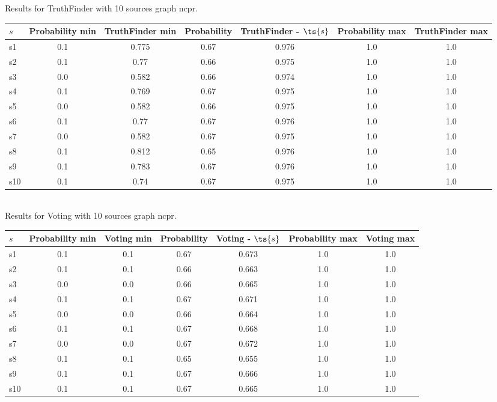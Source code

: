 \documentclass{article}
\begin{document}
\noindent Results for TruthFinder with 10 sources graph ncpr.

\noindent\begin{tabular}{|l|c|c|c|c|c|c|}
\hline
$s$& Probability min & TruthFinder min & Probability & TruthFinder - $\ts{s}$ & Probability max & TruthFinder max\\
\hline
s1 &0.1 & 0.775 & 0.67 & 0.976 & 1.0 & 1.0\\
\hline
s2 &0.1 & 0.77 & 0.66 & 0.975 & 1.0 & 1.0\\
\hline
s3 &0.0 & 0.582 & 0.66 & 0.974 & 1.0 & 1.0\\
\hline
s4 &0.1 & 0.769 & 0.67 & 0.975 & 1.0 & 1.0\\
\hline
s5 &0.0 & 0.582 & 0.66 & 0.975 & 1.0 & 1.0\\
\hline
s6 &0.1 & 0.77 & 0.67 & 0.976 & 1.0 & 1.0\\
\hline
s7 &0.0 & 0.582 & 0.67 & 0.975 & 1.0 & 1.0\\
\hline
s8 &0.1 & 0.812 & 0.65 & 0.976 & 1.0 & 1.0\\
\hline
s9 &0.1 & 0.783 & 0.67 & 0.976 & 1.0 & 1.0\\
\hline
s10 &0.1 & 0.74 & 0.67 & 0.975 & 1.0 & 1.0\\
\hline
\end{tabular}\\

\noindent Results for Voting with 10 sources graph ncpr.

\noindent\begin{tabular}{|l|c|c|c|c|c|c|}
\hline
$s$& Probability min & Voting min & Probability & Voting - $\ts{s}$ & Probability max & Voting max\\
\hline
s1 &0.1 & 0.1 & 0.67 & 0.673 & 1.0 & 1.0\\
\hline
s2 &0.1 & 0.1 & 0.66 & 0.663 & 1.0 & 1.0\\
\hline
s3 &0.0 & 0.0 & 0.66 & 0.665 & 1.0 & 1.0\\
\hline
s4 &0.1 & 0.1 & 0.67 & 0.671 & 1.0 & 1.0\\
\hline
s5 &0.0 & 0.0 & 0.66 & 0.664 & 1.0 & 1.0\\
\hline
s6 &0.1 & 0.1 & 0.67 & 0.668 & 1.0 & 1.0\\
\hline
s7 &0.0 & 0.0 & 0.67 & 0.672 & 1.0 & 1.0\\
\hline
s8 &0.1 & 0.1 & 0.65 & 0.655 & 1.0 & 1.0\\
\hline
s9 &0.1 & 0.1 & 0.67 & 0.666 & 1.0 & 1.0\\
\hline
s10 &0.1 & 0.1 & 0.67 & 0.665 & 1.0 & 1.0\\
\hline
\end{tabular}\\
\end{document}

